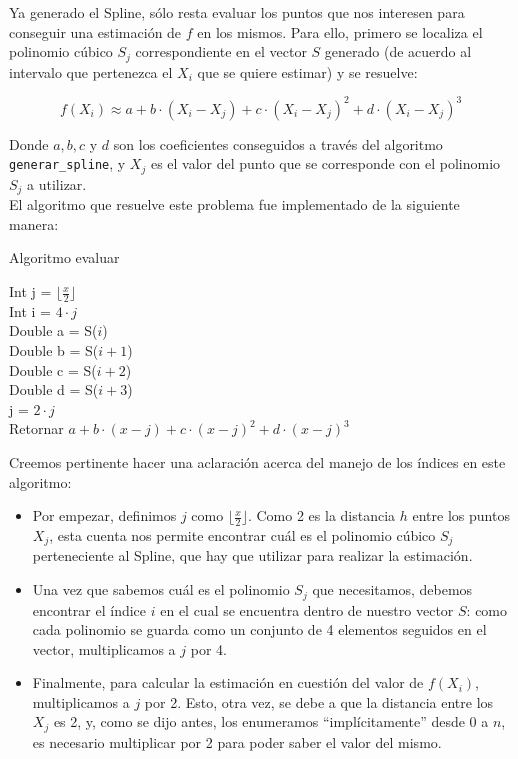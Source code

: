 \documentclass[a4paper]{article}
\begin{document}
Ya generado el Spline, sólo resta evaluar los puntos que nos interesen para conseguir una estimación de $f$ en los mismos. Para ello, primero se localiza el polinomio cúbico $S_j$ correspondiente en el vector $S$ generado (de acuerdo al intervalo que pertenezca el $X_i$ que se quiere estimar) y se resuelve:

\[f(X_i) \approx a+b\cdot (X_i - X_j)+c \cdot (X_i - X_j)^{2} + d \cdot (X_i - X_j)^{3}\]

\bigskip
Donde $a, b, c$ y $d$ son los coeficientes conseguidos a través del algoritmo \texttt{generar_spline}, y $X_j$ es el valor del punto que se corresponde con el polinomio $S_j$ a utilizar. \\
\indent El algoritmo que resuelve este problema fue implementado de la siguiente manera:

\IncMargin{1em}
\begin{algorithm}[h!]
\NoCaptionOfAlgo
\caption{Algoritmo evaluar}

\bigskip

Int j = $\lfloor \frac{x}{2} \rfloor$ \\
Int i = $4 \cdot j$ \\
\bigskip
Double a = S($i$)\\
Double b = S($i+1$)\\
Double c = S($i+2$)\\
Double d = S($i+3$)\\
\bigskip
j = $2 \cdot j$\\
\bigskip
Retornar $a+b\cdot (x - j)+c \cdot (x - j)^{2} + d \cdot (x - j)^{3}$
\end{algorithm}\DecMargin{1em}

\bigskip
Creemos pertinente hacer una aclaración acerca del manejo de los índices en este algoritmo:
\begin{itemize}
\item Por empezar, definimos $j$ como $\lfloor \frac{x}{2} \rfloor$. Como 2 es la distancia $h$ entre los puntos $X_j$, esta cuenta nos permite encontrar cuál es el polinomio cúbico $S_j$ perteneciente al Spline, que hay que utilizar para realizar la estimación.
\item Una vez que sabemos cuál es el polinomio $S_j$ que necesitamos, debemos encontrar el índice $i$ en el cual se encuentra dentro de nuestro vector $S$: como cada polinomio se guarda como un conjunto de 4 elementos seguidos en el vector, multiplicamos a $j$ por 4.
\item Finalmente, para calcular la estimación en cuestión del valor de $f(X_i)$, multiplicamos a $j$ por 2. Esto, otra vez, se debe a que la distancia entre los $X_j$ es 2, y, como se dijo antes, los enumeramos ``implícitamente'' desde 0 a $n$, es necesario multiplicar por 2 para poder saber el valor del mismo.
\end{itemize}
\end{document}
